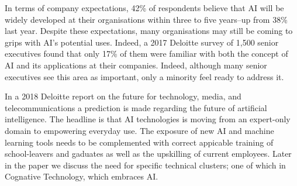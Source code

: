 In terms of company expectations, 42\%  of respondents believe that AI will be widely developed at their organisations within three to five years--up from 38\% last year. Despite these expectations, many organisations may still be coming to grips with AI's potential uses. Indeed, a 2017 Deloitte survey of 1,500 senior executives found that only 17\% of them were familiar with both the concept of AI and its applications at their companies. Indeed, although many senior executives see this area as important, only a minority feel ready to address it.

In a 2018 Deloitte report on the future for technology, media, and telecommunications a prediction is made regarding the future of artificial intelligence. The headline is that AI technologies is moving from an expert-only domain to empowering everyday use. The exposure of new AI and machine learning tools needs to be complemented with correct appicable training of school-leavers and gaduates as well as the upskilling of current employees. Later in the paper we discuss the need for specific technical clusters; one of which in Cognative Technology, which embraces AI.

\subsection{}
